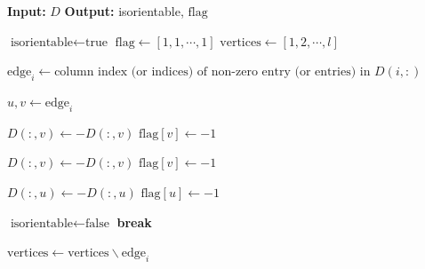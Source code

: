 \begin{algorithm}[H]
\caption{\textsc{Reorientation}}
\label{alg:reort}
\begin{algorithmic}[1]
\State \textbf{Input:} $D$
\State \textbf{Output:} isorientable, $\textrm{flag}$ %


\State $\textrm{isorientable}\gets \textrm{true}$
\State $\text{flag}\gets [1, 1, \cdots, 1]$ 
\State $\text{vertices} \gets [1, 2, \cdots, l]$ 

{}
\State $\text{edge}_i\gets \text{column index (or indices) of non-zero entry (or entries) in } D(i, :)$ 

\State $u, v\gets \text{edge}_i$

\State $D(:, v)\gets -D(:, v)$
\State $\textrm{flag}[v]\gets -1$

\State $D(:, v)\gets -D(:, v)$
\State $\textrm{flag}[v]\gets -1$

\State $D(:, u)\gets -D(:, u)$
\State $\textrm{flag}[u]\gets -1$

\State $\text{isorientable}\gets \text{false}$
\State \textbf{break}
\EndIf

\EndIf
\EndIf
\State $\text{vertices}\gets \text{vertices}\backslash \text{edge}_i$

\EndFor

\end{algorithmic}
\end{algorithm}


